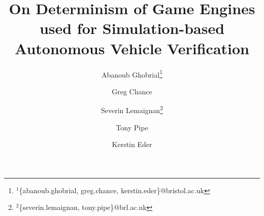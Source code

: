 \documentclass[letterpaper, 10 pt, journal, twoside]{IEEEtran}
\begin{document}
\title{On Determinism of Game Engines used for Simulation-based Autonomous Vehicle Verification}
\author[1,3]{Abanoub Ghobrial\thanks{$^{1}${\footnotesize \{abanoub.ghobrial, greg.chance, kerstin.eder\}@bristol.ac.uk}}}
\author[1,3]{Greg Chance}
\author[2,3]{Severin Lemaignan\thanks{$^{2}${\footnotesize \{severin.lemaignan, tony.pipe\}@brl.ac.uk}}}
\author[2,3]{Tony Pipe}
\author[1,3]{Kerstin Eder}
\maketitle
\end{document}
